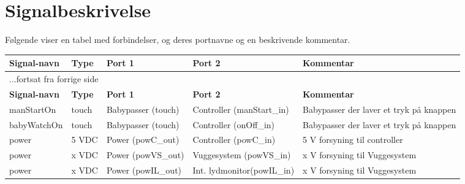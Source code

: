 

\section{Signalbeskrivelse}
Følgende viser en tabel med forbindelser, og deres portnavne og en beskrivende kommentar.

\begin{center}
\label{table:Signaltabel}
\begin{longtable}{|p{}|p{}|p{}|p{}|p{3cm}|}
\hline
\textbf{Signal-navn}	&\textbf{Type} 		&\textbf{Port 1} 	&\textbf{Port 2} 			&\textbf{Kommentar} \\ \hline
\endfirsthead
\multicolumn{5}{l}{...fortsat fra forrige side} \\ \hline 
\textbf{Signal-navn}	&\textbf{Type} 		&\textbf{Port 1} 	&\textbf{Port 2} 			&\textbf{Kommentar} \\ \hline
\endhead


manStartOn
&touch
&Babypasser \newline (touch)
&Controller \newline (manStart\_in)
&Babypasser der laver et tryk på knappen
\\\hline

babyWatchOn
&touch
&Babypasser \newline (touch)
&Controller \newline (onOff\_in)
&Babypasser der laver et tryk på knappen
\\\hline

power
&5 VDC
&Power \newline(powC\_out)
&Controller \newline(powC\_in)
&5 V forsyning til controller
\\\hline

power
&x VDC
&Power \newline(powVS\_out)
&Vuggesystem \newline(powVS\_in)
&x V forsyning til Vuggesystem
\\\hline

power
&x VDC
&Power \newline(powIL\_out)
&Int. lydmonitor\newline(powIL\_in)
&x V forsyning til Vuggesystem
\\\hline


\end{longtable}
\end{center}
